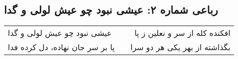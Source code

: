 \begin{center}
\section*{رباعی شماره ۲: عیشی نبود چو عیش لولی و گدا}
\label{sec:002}
\begin{longtable}{l p{0.5cm} r}
عیشی نبود چو عیش لولی و گدا
&&
افکنده کله از سر و نعلین ز پا
\\
پا بر سر جان نهاده، دل کرده فدا
&&
بگذاشته از بهر یکی هر دو سرا
\\
\end{longtable}
\end{center}
